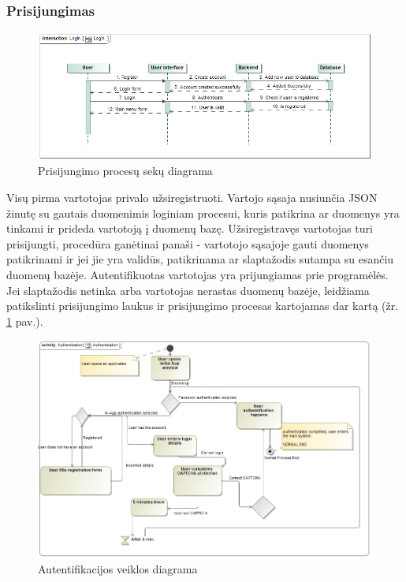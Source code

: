 \documentclass{VUMIFPSkursinis}
\begin{document}
	\subsubsection{Prisijungimas}
		\begin{figure}[H]
			\centering
			\includegraphics[scale=0.5]{img/Login_sequence}
			\caption{Prisijungimo procesų sekų diagrama}
			\label{img:Login_sequence}
		\end{figure}
		Visų pirma vartotojas privalo užsiregistruoti. Vartojo sąsaja nusiunčia JSON 
		žinutę su gautais duomenimis loginiam procesui, kuris patikrina ar duomenys yra tinkami ir
		prideda vartotoją į duomenų bazę. Užsiregistravęs vartotojas turi prisijungti,
		procedūra ganėtinai panaši - vartotojo sąsajoje gauti duomenys patikrinami ir 
		jei jie yra validūs, patikrinama ar slaptažodis sutampa su esančiu duomenų
		bazėje. Autentifikuotas vartotojas yra prijungiamas prie programėlės. 
		Jei slaptažodis netinka arba vartotojas nerastas duomenų bazėje, leidžiama
		patikslinti prisijungimo laukus ir prisijungimo procesas kartojamas dar kartą (žr. \ref{img:Login_sequence} pav.).
		\begin{figure}[H]
			\centering
			\includegraphics[scale=0.5]{img/Authentication}
			\caption{Autentifikacijos veiklos diagrama}
			\label{img:Authentication}
		\end{figure}
\end{document}
